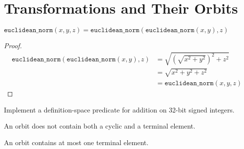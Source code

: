 
\chapter{Transformations and Their Orbits}

\begin{lemma}
	$\mathtt{euclidean\_norm}(x, y, z) = \mathtt{euclidean\_norm}(\mathtt{euclidean\_norm}(x, y), z)$
\end{lemma}

\begin{proof}
	\begin{align*}
		\mathtt{euclidean\_norm}(\mathtt{euclidean\_norm}(x, y), z)
		&= \sqrt{\left (\sqrt{x^2 + y^2} \right )^2 + z^2}\\
		&= \sqrt{x^2 + y^2 + z^2}\\
		&= \mathtt{euclidean\_norm}(x, y, z)
	\end{align*}
\end{proof}

\begin{exercise}
	Implement a definition-space predicate for addition on 32-bit signed integers.
\end{exercise}



\begin{lemma}
	An orbit does not contain both a cyclic and a terminal element.
\end{lemma}

\begin{lemma}
	An orbit contains at most one terminal element.
\end{lemma}
